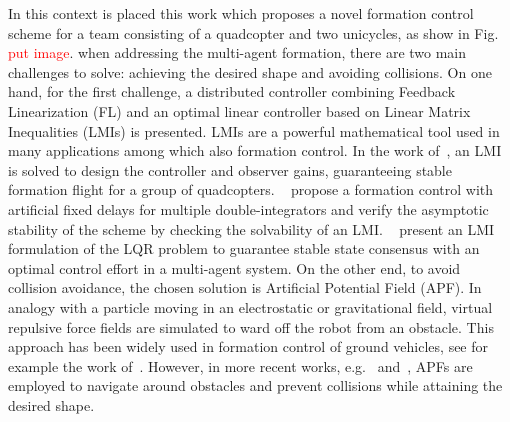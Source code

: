 \documentclass{ifacconf}
\begin{document}
In this context is placed this work which proposes a novel formation control scheme
for a team consisting of a quadcopter and two unicycles, as show in Fig.
\textcolor{red}{put image}.
when addressing the multi-agent formation, there are two main challenges to solve: 
achieving the desired shape and avoiding collisions.
On one hand, for the first challenge, a distributed controller combining Feedback 
Linearization (FL) and an optimal linear controller based on Linear Matrix 
Inequalities (LMIs) is presented.
LMIs are a powerful mathematical tool used in many applications among which also 
formation control.
In the work of~\cite{Trejo2023}, an LMI is solved to design the controller 
and observer gains, guaranteeing stable formation flight for a group of quadcopters.
~\cite{Deshpande2011} propose a formation control with artificial 
fixed delays for multiple double-integrators and 
verify the asymptotic stability of the scheme by checking 
the solvability of an LMI.
~\cite{Semsar2009} present an LMI formulation of the LQR problem 
to guarantee stable state consensus with an optimal control effort 
in a multi-agent system.
On the other end, to avoid collision avoidance, the chosen solution is 
Artificial Potential Field (APF).
In analogy with a particle moving in an electrostatic or gravitational
field, virtual repulsive force fields are simulated to ward off the robot
from an obstacle.
This approach has been widely used in formation control of ground vehicles,
see for example the work of~\cite{Yongshen2018}.
However, in more recent works, e.g.~\cite{HAN2024106105} and~\cite{Piet2025Control},
APFs are employed to navigate around obstacles and prevent collisions 
while attaining the desired shape.
\end{document}
